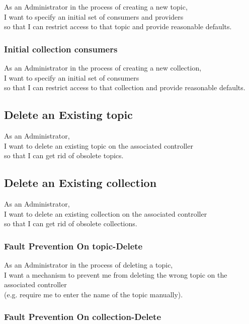 As an Administrator in the process of creating a new topic,\\
I want to specify an initial set of consumers and providers \\
so that I can restrict access to that topic and provide reasonable defaults.

\subsubsection{Initial collection consumers}\label{sec:requirement-initial-collection-consumer}

As an Administrator in the process of creating a new collection,\\
I want to specify an initial set of consumers \\
so that I can restrict access to that collection and provide reasonable defaults.

\subsection{Delete an Existing topic}\label{sec:delete-topic}

As an Administrator,\\
I want to delete an existing topic on the associated controller\\
so that I can get rid of obsolete topics.

\subsection{Delete an Existing collection}\label{sec:delete-collection}

As an Administrator,\\
I want to delete an existing collection on the associated controller\\
so that I can get rid of obsolete collections.


\subsubsection{Fault Prevention On topic-Delete}

As an Administrator in the process of deleting a topic, \\
I want a mechanism to prevent me from deleting the wrong topic on the associated controller\\
(e.g. require me to enter the name of the topic manually).

\subsubsection{Fault Prevention On collection-Delete}

